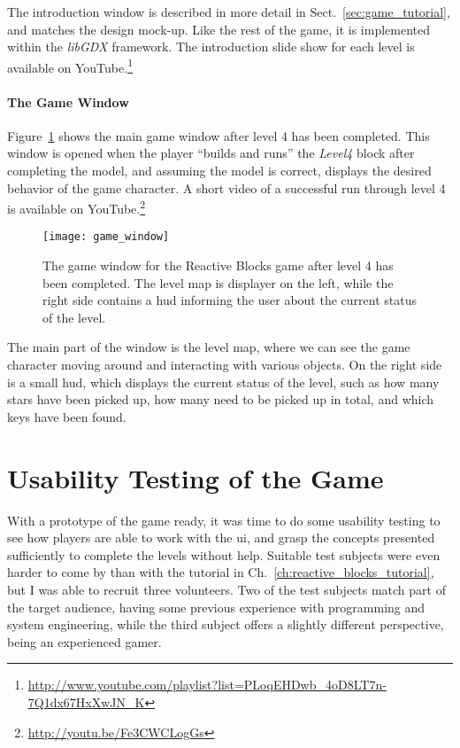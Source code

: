 \noindent
The introduction window is described in more detail in Sect.~\ref{sec:game_tutorial}, and matches the design mock-up. Like the rest of the game, it is implemented within the \emph{libGDX} framework. The introduction slide show for each level is available on YouTube.\footnote{\url{http://www.youtube.com/playlist?list=PLoqEHDwb_4oD8LT7n-7Q1dx67HxXwJN_K}}

\paragraph{The Game Window}
Figure~\ref{fig:game_window} shows the main game window after level 4 has been completed. This window is opened when the player ``builds and runs'' the \emph{Level4} block after completing the model, and assuming the model is correct, displays the desired behavior of the game character. A short video of a successful run through level 4 is available on YouTube.\footnote{\url{http://youtu.be/Fe3CWCLogGs}}

\begin{figure}[htp]
	\centering
	\texttt{[image: game\_window]}
	\caption[Reactive Blocks game window]{The game window for the Reactive Blocks game after level 4 has been completed. The level map is displayer on the left, while the right side contains a \gls{hud} informing the user about the current status of the level.}
	\label{fig:game_window}
\end{figure}

\noindent
The main part of the window is the level map, where we can see the game character moving around and interacting with various objects. On the right side is a small \gls{hud}, which displays the current status of the level, such as how many stars have been picked up, how many need to be picked up in total, and which keys have been found.

\section{Usability Testing of the Game}
\label{sec:game_testing}
With a prototype of the game ready, it was time to do some usability testing to see how players are able to work with the \gls{ui}, and grasp the concepts presented sufficiently to complete the levels without help. Suitable test subjects were even harder to come by than with the tutorial in Ch.~\ref{ch:reactive_blocks_tutorial}, but I was able to recruit three volunteers. Two of the test subjects match part of the target audience, having some previous experience with programming and system engineering, while the third subject offers a slightly different perspective, being an experienced gamer.

